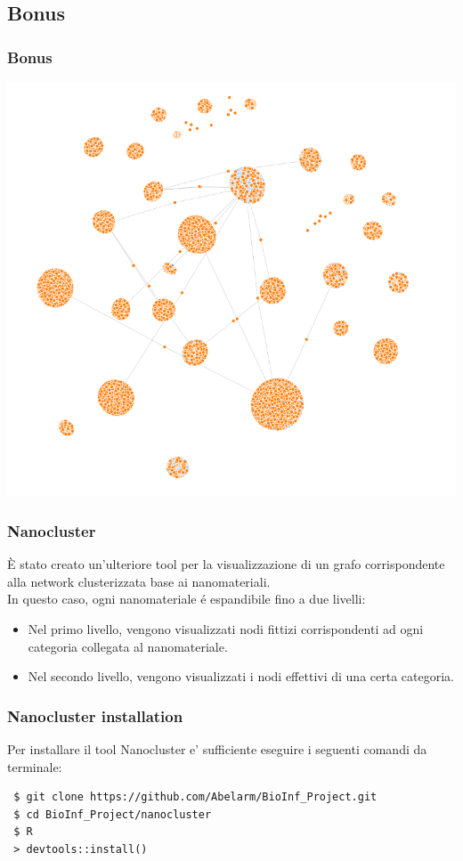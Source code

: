 \documentclass{beamer}
\begin{document}
\subsection{Bonus}

\begin{frame}
\frametitle{Bonus}
\begin{center}
\includegraphics[scale=0.27]{img/nano_cluster_network.png} 
\end{center}
\end{frame}

\begin{frame}
\frametitle{Nanocluster}
È stato creato un'ulteriore tool per la visualizzazione di un grafo corrispondente alla network clusterizzata base ai nanomateriali.\\
\medskip
In questo caso, ogni nanomateriale \'e espandibile fino a due livelli:
\begin{itemize}
	\item Nel primo livello, vengono visualizzati nodi fittizi corrispondenti ad ogni categoria collegata al nanomateriale. 
	\item Nel secondo livello, vengono visualizzati i nodi effettivi di una certa categoria.
\end{itemize}
\end{frame}



\begin{frame}[fragile]
\frametitle{Nanocluster installation}
Per installare il tool Nanocluster e' sufficiente eseguire i seguenti comandi da terminale:
\begin{footnotesize}
\begin{lstlisting}
 $ git clone https://github.com/Abelarm/BioInf_Project.git
 $ cd BioInf_Project/nanocluster
 $ R
 > devtools::install()
\end{lstlisting}
\end{footnotesize}
\end{frame}
\end{document}

